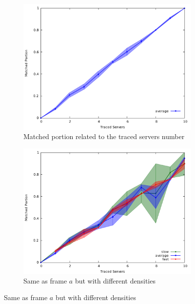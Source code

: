 \begin{figure}
	\begin{subfigure}{.5\textwidth}
		\centering
		\includegraphics[width=1\linewidth]{graphs/s_server_mport_average_only.pdf}
		\caption{Matched portion related to the traced servers number}
		\label{fig:g_mporta}
	\end{subfigure} 
	\begin{subfigure}{.5\textwidth}
		\centering
		\includegraphics[width=1\linewidth]{graphs/s_server_mport.pdf}
		\caption{Same as frame $a$ but with different densities}
		\label{fig:g_mportb}
	\end{subfigure}


\end{figure}
